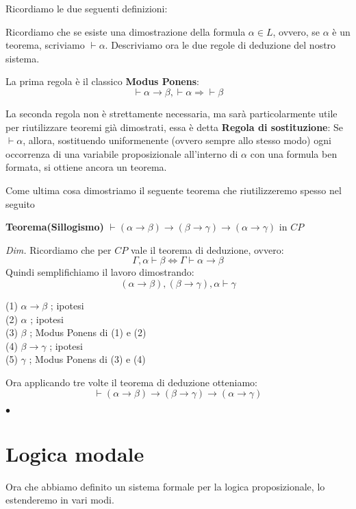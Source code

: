 \documentclass[a4paper, 12pt]{article}
\begin{document}
Ricordiamo le due seguenti definizioni:

Ricordiamo che se esiste una dimostrazione della formula $\alpha \in L$,
ovvero, se $\alpha$ è un teorema, scriviamo $\vdash \alpha$.
Descriviamo ora le due regole di deduzione del nostro sistema.

La prima regola è il classico \textbf{Modus Ponens}:
$$\vdash \alpha \rightarrow \beta, \vdash \alpha \Rightarrow \vdash \beta$$

La seconda regola non è strettamente necessaria, ma sarà particolarmente utile per riutilizzare
teoremi già dimostrati, essa è detta \textbf{Regola di sostituzione}:
Se $\vdash \alpha$, allora, sostituendo uniformenente (ovvero sempre allo stesso modo)
ogni occorrenza di una variabile proposizionale all'interno di $\alpha$
con una formula ben formata, si ottiene ancora un teorema.

Come ultima cosa dimostriamo il seguente teorema che riutilizzeremo spesso nel seguito

\begin{flushleft}
\textbf{Teorema(Sillogismo)}
$\vdash (\alpha \rightarrow \beta) \rightarrow
        (\beta \rightarrow \gamma) \rightarrow (\alpha \rightarrow \gamma)$ in $CP$

\textit{Dim.}
Ricordiamo che per $CP$ vale il teorema di deduzione, ovvero:
$$\Gamma,\alpha \vdash \beta \Leftrightarrow \Gamma \vdash \alpha \rightarrow \beta$$
Quindi semplifichiamo il lavoro dimostrando:
$$(\alpha \rightarrow \beta),(\beta \rightarrow \gamma),\alpha \vdash \gamma$$

(1) $\alpha \rightarrow \beta$ ; ipotesi \\
(2) $\alpha$ ; ipotesi \\
(3) $\beta$ ; Modus Ponens di (1) e (2) \\
(4) $\beta \rightarrow \gamma$ ; ipotesi \\
(5) $\gamma$ ; Modus Ponens di (3) e (4)

Ora applicando tre volte il teorema di deduzione otteniamo:
$$\vdash (\alpha \rightarrow \beta) \rightarrow (\beta \rightarrow \gamma) \rightarrow (\alpha \rightarrow \gamma)$$

\begin{flushright}
$\bullet$
\end{flushright}
\end{flushleft}


\section{Logica modale}
Ora che abbiamo definito un sistema formale per la logica proposizionale,
lo estenderemo in vari modi.
\end{document}
